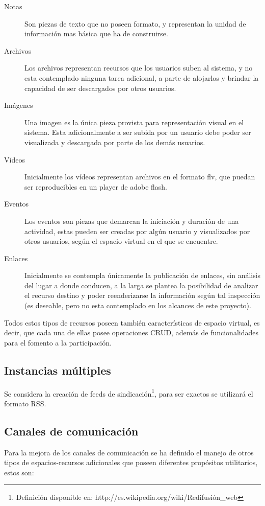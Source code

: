 \begin{description}
\item [Notas] Son piezas de texto que no poseen formato, y representan la unidad
de información mas básica que ha de construirse.
\item [Archivos] Los archivos representan recursos que los usuarios suben al
sistema, y no esta contemplado ninguna tarea adicional, a parte de alojarlos y
brindar la capacidad de ser descargados por otros usuarios.
\item [Imágenes] Una imagen es la única pieza provista para representación
visual en el sistema. Esta adicionalmente a ser subida por un usuario debe
poder ser visualizada y descargada por parte de los demás usuarios.
\item [Vídeos] Inicialmente los vídeos representan archivos en el formato flv,
que puedan ser reproducibles en un player de adobe flash.
\item [Eventos] Los eventos son piezas que demarcan la iniciación y duración de
una actividad, estas pueden ser creadas por algún usuario y visualizados por
otros usuarios, según el espacio virtual en el que se encuentre.
\item [Enlaces] Inicialmente se contempla únicamente la publicación de enlaces,
sin análisis del lugar a donde conducen, a la larga se plantea la posibilidad de
analizar el recurso destino y poder reenderizarse la información según tal
inspección (es deseable, pero no esta contemplado en los alcances de este
proyecto).
\end{description}

Todos estos tipos de recursos poseen también características de espacio virtual,
es decir, que cada una de ellas posee operaciones CRUD, además de
funcionalidades para el fomento a la participación.

\subsection{Instancias múltiples}

Se considera la creación de feeds de
sindicación\footnote{Definición disponible en:
http://es.wikipedia.org/wiki/Redifusión\_web}, para ser exactos se utilizará
el formato RSS.

\subsection{Canales de comunicación}

Para la mejora de los canales de comunicación se ha definido el manejo de otros
tipos de espacios-recursos adicionales que poseen diferentes propósitos
utilitarios, estos son:

